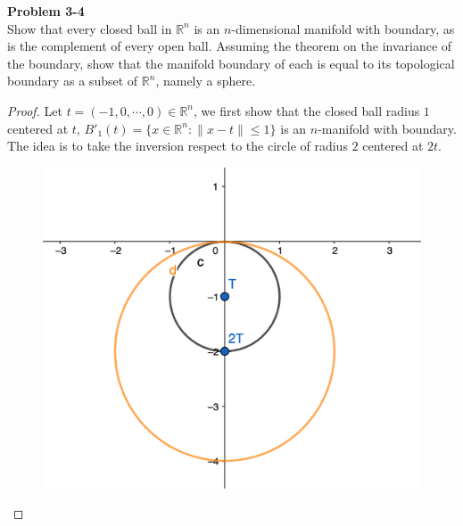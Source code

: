 \documentclass[12pt, a4paper]{article}
\theoremstyle{plain}
\newcommand{\R}{\mathbb{R}}
\newenvironment{problem}[2][Problem]
    { \begin{mdframed}[backgroundcolor=gray!20] \textbf{#1 #2} \\}
    {  \end{mdframed}}
\begin{document}
\begin{problem}{3-4}
Show that every closed ball in $\R^n$ is an $n$-dimensional manifold with boundary, as is the complement of every open ball. Assuming the theorem on the invariance of the boundary, show that the manifold boundary of each is equal to its topological boundary as a subset of $\R^n$, namely a sphere.
\end{problem}
	\begin{proof}
	Let $t=(-1,0,\cdots,0)\in \R^n$, we first show that the closed ball radius $1$ centered at $t$, $B'_1(t)=\{x\in\R^n:\|x-t\|\leq 1\}$ is an $n$-manifold with boundary. The idea is to take the inversion respect to the circle of radius $2$ centered at $2t$.
	
	\begin{center}
	\begin{figure}
	\includegraphics[scale=1]{image1.png}
	\end{figure}
	\end{center}
	

\end{proof}
\end{document}
